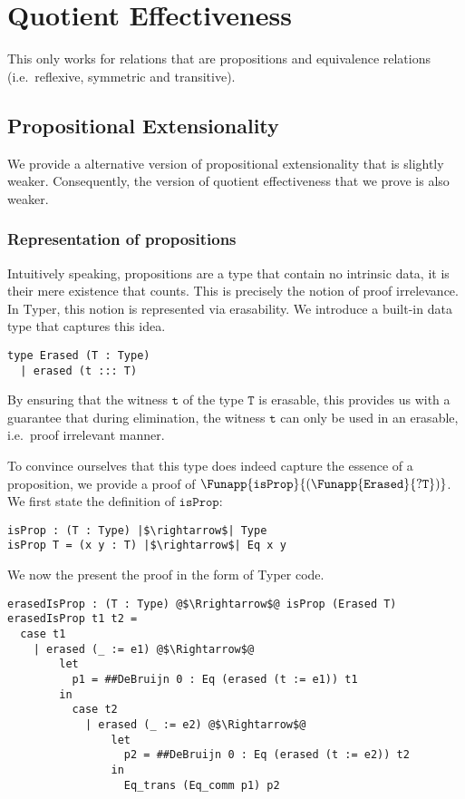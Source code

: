 \documentclass[12pt,twoside,maitrise]{dms}
\theoremstyle{definition}
\numberwithin{equation}{section}
\numberwithin{table}{chapter}
\numberwithin{figure}{chapter}
\newcommand\id[1] {\texttt{#1}}
\begin{document}
\chapter{Quotient Effectiveness}\label{ch:quotient-effectiveness}

This only works for relations that are propositions and equivalence relations
(i.e.\ reflexive, symmetric and transitive).

\section{Propositional Extensionality}
We provide a alternative version of propositional extensionality that is
slightly weaker. Consequently, the version of quotient effectiveness that we
prove is also weaker.

\subsection*{Representation of propositions}\label{subsec:mere-propositions}

Intuitively speaking, propositions are a type that contain no intrinsic data, it
is their mere existence that counts. This is precisely the notion of proof
irrelevance. In Typer, this notion is represented via erasability. We introduce
a built-in data type that captures this idea.

\begin{verbatim}
type Erased (T : Type)
  | erased (t ::: T)
\end{verbatim}

By ensuring that the witness $\id{t}$ of the type $\id{T}$ is erasable, this
provides us with a guarantee that during elimination, the witness $\id{t}$ can
only be used in an erasable, i.e.\ proof irrelevant manner.

To convince ourselves that this type does indeed capture the essence of a
proposition, we provide a proof of
$\Funapp{\id{isProp}}{(\Funapp{\id{Erased}}{?\id{T}})}$. We first state the
definition of $\id{isProp}$:

\begin{verbatim}
isProp : (T : Type) |$\rightarrow$| Type
isProp T = (x y : T) |$\rightarrow$| Eq x y
\end{verbatim}

We now the present the proof in the form of Typer code.

\begin{verbatim}
erasedIsProp : (T : Type) @$\Rrightarrow$@ isProp (Erased T)
erasedIsProp t1 t2 =
  case t1
    | erased (_ := e1) @$\Rightarrow$@
        let
          p1 = ##DeBruijn 0 : Eq (erased (t := e1)) t1
        in
          case t2
            | erased (_ := e2) @$\Rightarrow$@
                let
                  p2 = ##DeBruijn 0 : Eq (erased (t := e2)) t2
                in
                  Eq_trans (Eq_comm p1) p2
\end{verbatim}
\end{document}
